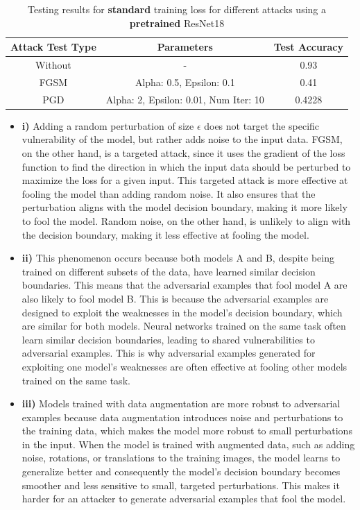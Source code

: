\documentclass{article}
\begin{document}
\begin{table}[h!]
    \centering
    \begin{tabular}{|c|c|c|}
    \hline
    \textbf{Attack Test Type} & \textbf{Parameters} & \textbf{Test Accuracy} \\
    \hline
    Without & - & 0.93 \\
    \hline
    FGSM & Alpha: 0.5, Epsilon: 0.1 & 0.41 \\
    \hline
    PGD & Alpha: 2, Epsilon: 0.01, Num Iter: 10 & 0.4228 \\
    \hline
    \end{tabular}
    \caption{Testing results for \textbf{standard} training loss for different attacks using a \textbf{pretrained} ResNet18}
\end{table}



\begin{itemize}
    \item \textbf{i)} Adding a random perturbation of size $\epsilon$ does not target the specific vulnerability of the model,
    but rather adds noise to the input data. FGSM, on the other hand, is a targeted attack, since it uses the gradient of the
    loss function to find the direction in which the input data should be perturbed to maximize the loss for a given input. 
    This targeted attack is more effective at fooling the model than adding random noise. It also ensures that the perturbation
    aligns with the model decision boundary, making it more likely to fool the model. Random noise, on the other hand, is unlikely
    to align with the decision boundary, making it less effective at fooling the model.

    \item \textbf{ii)} This phenomenon occurs because both models A and B, despite being trained on different subsets of the
    data, have learned similar decision boundaries. This means that the adversarial examples that fool model A are also likely
    to fool model B. This is because the adversarial examples are designed to exploit the weaknesses in the model's decision
    boundary, which are similar for both models. Neural networks trained on the same task often learn similar decision boundaries,
    leading to shared vulnerabilities to adversarial examples. This is why adversarial examples generated for exploiting one
    model's weaknesses are often effective at fooling other models trained on the same task.

    \item \textbf{iii)} Models trained with data augmentation are more robust to adversarial examples because data augmentation
    introduces noise and perturbations to the training data, which makes the model more robust to small perturbations in the input.
    When the model is trained with augmented data, such as adding noise, rotations, or translations to the training images,
    the model learns to generalize better and consequently the model's decision boundary becomes smoother and less sensitive
    to small, targeted perturbations. This makes it harder for an attacker to generate adversarial examples that fool the model.
\end{itemize}
\end{document}
